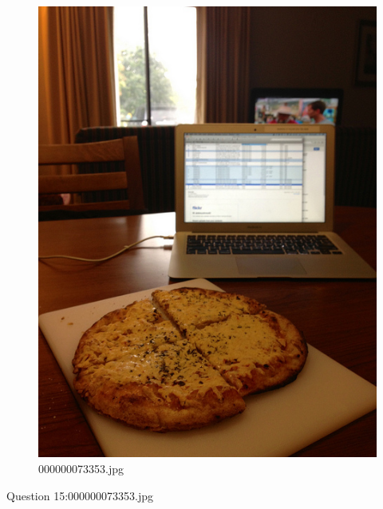    \begin{figure}[h]
        \centering
        \includegraphics[width=0.8\linewidth]{../image set/easy/000000073353.jpg}
        \caption{000000073353.jpg}
    \end{figure}
    Question 15:000000073353.jpg
